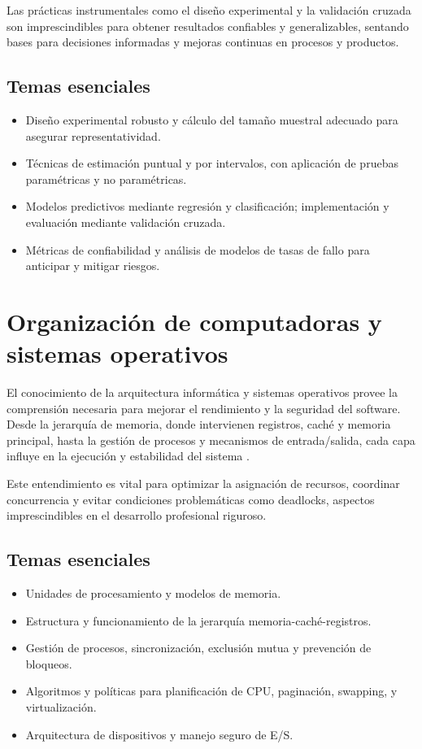 Las prácticas instrumentales como el diseño experimental y la validación cruzada son imprescindibles para obtener resultados confiables y generalizables, sentando bases para decisiones informadas y mejoras continuas en procesos y productos.

\subsection*{Temas esenciales}
\begin{itemize}
  \item Diseño experimental robusto y cálculo del tamaño muestral adecuado para asegurar representatividad.
  \item Técnicas de estimación puntual y por intervalos, con aplicación de pruebas paramétricas y no paramétricas.
  \item Modelos predictivos mediante regresión y clasificación; implementación y evaluación mediante validación cruzada.
  \item Métricas de confiabilidad y análisis de modelos de tasas de fallo para anticipar y mitigar riesgos.
\end{itemize}


\section{Organización de computadoras y sistemas operativos}
El conocimiento de la arquitectura informática y sistemas operativos provee la comprensión necesaria para mejorar el rendimiento y la seguridad del software. Desde la jerarquía de memoria, donde intervienen registros, caché y memoria principal, hasta la gestión de procesos y mecanismos de entrada/salida, cada capa influye en la ejecución y estabilidad del sistema \parencite{patterson2014,tanenbaum2014}.

Este entendimiento es vital para optimizar la asignación de recursos, coordinar concurrencia y evitar condiciones problemáticas como deadlocks, aspectos imprescindibles en el desarrollo profesional riguroso.

\subsection*{Temas esenciales}
\begin{itemize}
  \item Unidades de procesamiento y modelos de memoria.
  \item Estructura y funcionamiento de la jerarquía memoria-caché-registros.
  \item Gestión de procesos, sincronización, exclusión mutua y prevención de bloqueos.
  \item Algoritmos y políticas para planificación de CPU, paginación, swapping, y virtualización.
  \item Arquitectura de dispositivos y manejo seguro de E/S.
\end{itemize}


